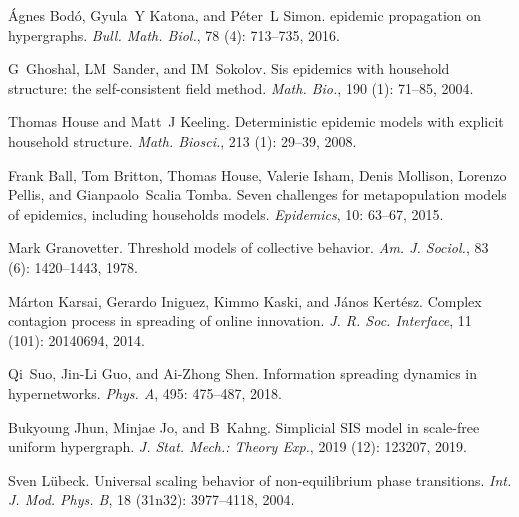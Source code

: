 {\'A}gnes Bod{\'o}, Gyula~Y Katona, and P{\'e}ter~L Simon.
 epidemic propagation on hypergraphs.
\newblock \emph{Bull. Math. Biol.}, 78 (4): 713--735, 2016.

G~Ghoshal, LM~Sander, and IM~Sokolov.
\newblock Sis epidemics with household structure: the self-consistent field
method.
\newblock \emph{Math. Bio.}, 190 (1): 71--85, 2004.

Thomas House and Matt~J Keeling.
\newblock Deterministic epidemic models with explicit household structure.
\newblock \emph{Math. Biosci.}, 213 (1): 29--39, 2008.

Frank Ball, Tom Britton, Thomas House, Valerie Isham, Denis Mollison, Lorenzo
Pellis, and Gianpaolo~Scalia Tomba.
\newblock Seven challenges for metapopulation models of epidemics, including
households models.
\newblock \emph{Epidemics}, 10: 63--67, 2015.

Mark Granovetter.
\newblock Threshold models of collective behavior.
\newblock \emph{Am. J. Sociol.}, 83 (6): 1420--1443, 1978.

M{\'a}rton Karsai, Gerardo Iniguez, Kimmo Kaski, and J{\'a}nos Kert{\'e}sz.
\newblock Complex contagion process in spreading of online innovation.
\newblock \emph{J. R. Soc. Interface}, 11 (101): 20140694,
2014.

Qi~Suo, Jin-Li Guo, and Ai-Zhong Shen.
\newblock Information spreading dynamics in hypernetworks.
\newblock \emph{Phys. A}, 495: 475--487, 2018.

Bukyoung Jhun, Minjae Jo, and B~Kahng.
\newblock Simplicial {{SIS}} model in scale-free uniform hypergraph.
\newblock \emph{J. Stat. Mech.: Theory Exp.}, 2019 (12):
123207, 2019.

Sven L{\"u}beck.
\newblock Universal scaling behavior of non-equilibrium phase transitions.
\newblock \emph{Int. J. Mod. Phys. B}, 18 (31n32):
3977--4118, 2004.


